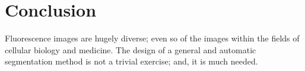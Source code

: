 \documentclass[10pt, journal, letterpaper, onecolumn, draftcls]{IEEEtran}
\begin{document}
%




\section{Conclusion}
\label{sec:Conc}
Fluorescence images are hugely diverse; even so of the images within the fields of cellular biology and medicine. The design of a general and  automatic segmentation method is not a trivial exercise; and, it is much needed.
\end{document}
